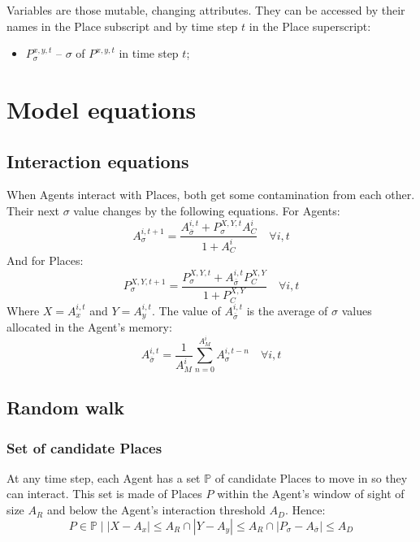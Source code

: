 \documentclass{article}
\begin{document}
\par Variables are those mutable, changing attributes. They can be accessed by their names in the Place subscript and by time step $t$ in the Place superscript: 

\begin{itemize}
    \item $P^{x,y,t}_{\sigma}$ -- $\sigma$ of $P^{x,y,t}$ in time step $t$;
\end{itemize}

\section{Model equations}

\subsection{Interaction equations}

\par When Agents interact with Places, both get some contamination from each other. Their next $\sigma$ value changes by the following equations. For Agents:  
\begin{equation}
    A^{i,t + 1}_{\sigma} = \frac{A^{i, t}_{\bar{\sigma}} + P^{X,Y,t}_{\sigma} A^{i}_{C}}{1 + A^{i}_{C}} \quad \forall i, t
\end{equation}
And for Places:
\begin{equation}
    P^{X,Y,t + 1}_{\sigma} = \frac{P^{X,Y,t}_{\sigma} + A^{i, t}_{\bar{\sigma}} P^{X,Y}_{C}}{1 + P^{X,Y}_{C}} \quad \forall i, t
\end{equation}
Where $X = A^{i,t}_{x}$ and $Y = A^{i,t}_{y}$. The value of $A^{i, t}_{\bar{\sigma}}$ is the average of $\sigma$ values allocated in the Agent's memory:
\begin{equation}
    A^{i, t}_{\bar{\sigma}} = \frac{1}{A^{i}_{M}} \sum_{n=0}^{A^{i}_{M}} A^{i, t - n}_{\sigma} \quad \forall i, t
\end{equation}

\subsection{Random walk}

\subsubsection{Set of candidate Places}

\par At any time step, each Agent has a set $\mathbb{P}$ of candidate Places to move in so they can interact. This set is made of Places $P$ within the Agent's window of sight of size $A_{R}$ and below the Agent's interaction threshold $A_{D}$. Hence:
\begin{equation}
    P \in \mathbb{P} \;\big|\;|X - A_{x}| \leq A_{R} \cap |Y - A_{y}| \leq A_{R} \cap |P_{\sigma} - A_{\bar{\sigma}}| \leq A_{D} 
\end{equation}
\end{document}
